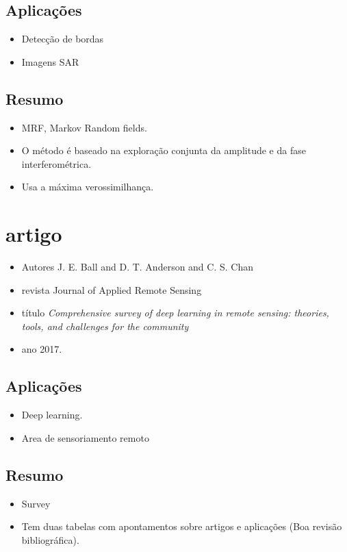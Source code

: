 \documentclass{article}
\begin{document}
\subsection{Aplicações}
\begin{itemize}
\item Detecção de bordas
\item Imagens SAR
\end{itemize}
\subsection{Resumo}
\begin{itemize}
\item MRF, Markov Random fields.
\item O método é baseado na exploração conjunta da amplitude e da fase interferométrica.
\item Usa a máxima verossimilhança. 
\end{itemize}

\section{artigo \cite{bac}}
\begin{itemize}
\item Autores J. E. Ball and D. T. Anderson and C. S. Chan
\item revista Journal of Applied Remote Sensing
\item título \textit{Comprehensive survey of deep learning in remote sensing: theories, tools, and challenges for the community}
\item ano 2017.
\end{itemize}
\subsection{Aplicações}
\begin{itemize}
\item Deep learning.
\item Area de sensoriamento remoto
\end{itemize}
\subsection{Resumo}
\begin{itemize}
\item Survey 
\item Tem duas tabelas com apontamentos sobre artigos e aplicações (Boa revisão bibliográfica).
\end{itemize}
\end{document}
